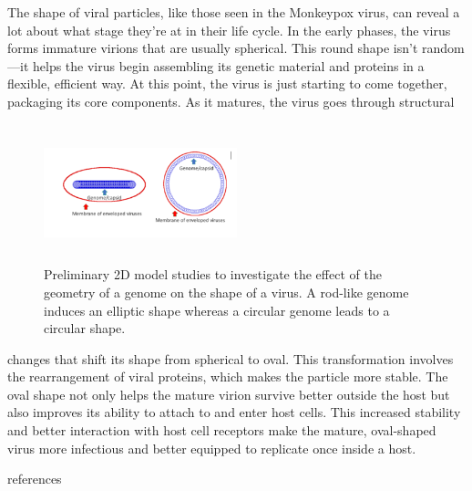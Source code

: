 \documentclass[12pt]{article}
\begin{document}
\begin{flushleft}
The shape of viral particles, like those seen in the Monkeypox virus, can reveal a lot about what stage they’re at in their life cycle. In the early phases, the virus forms immature virions that are usually spherical. This round shape isn’t random—it helps the virus begin assembling its genetic material and proteins in a flexible, efficient way. At this point, the virus is just starting to come together, packaging its core components. As it matures, the virus goes through structural 

\begin{figure}[!ht]
  \centering
  \includegraphics[width=0.5\textwidth,height=4cm]{monkeypox.png}  %
  \caption{Preliminary 2D model studies to
investigate the effect of the geometry of a
genome on the shape of a virus. A rod-like
genome induces an elliptic shape whereas a
circular genome leads to a circular shape.}
\end{figure}

\noindent changes that shift its shape from spherical to oval. This transformation involves the rearrangement of viral proteins, which makes the particle more stable. The oval shape not only helps the mature virion survive better outside the host but also improves its ability to attach to and enter host cells. This increased stability and better interaction with host cell receptors make the mature, oval-shaped virus more infectious and better equipped to replicate once inside a host.

\end{flushleft}

 {references}  
\end{document}
